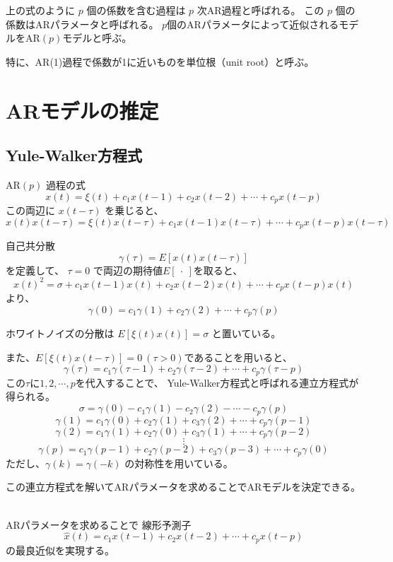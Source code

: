 \documentclass[uplatex,a4j,12pt,dvipdfmx]{jsarticle}
\begin{document}
上の式のように $p$ 個の係数を含む過程は $p$ 次AR過程と呼ばれる。
この $p$ 個の係数はARパラメータと呼ばれる。
$p$個のARパラメータによって近似されるモデルをAR$(p)$モデルと呼ぶ。

特に、AR(1)過程で係数が1に近いものを単位根（unit root）と呼ぶ。


\section{ARモデルの推定}

\subsection{Yule-Walker方程式}

AR$(p)$ 過程の式
\[
	x(t) = \xi(t) + c_{1} x(t-1) + c_{2} x(t-2) + \cdots + c_{p} x(t-p)
\]
この両辺に $x(t- \tau )$ を乗じると、
\[
	x(t)x(t- \tau ) = \xi(t)x(t- \tau ) + c_{1} x(t-1) x(t- \tau ) + \cdots + c_{p} x(t-p) x(t- \tau )
\]

自己共分散
\[
	\gamma(\tau) = E[ x(t) x(t-\tau) ]
\]
を定義して、
$\tau=0$ で両辺の期待値$E[ \ \cdot \ ]$を取ると、
\[
	x(t)^{2} = \sigma + c_{1} x(t-1) x(t) + c_{2} x(t-2) x(t) + \cdots + c_{p} x(t-p) x(t)
\]
より、
\[
	\gamma(0) = c_{1} \gamma(1) + c_{2} \gamma(2) + \cdots + c_{p} \gamma(p)
\]

ホワイトノイズの分散は $E[\xi(t)x(t)]=\sigma$ と置いている。

また、$E[\xi(t)x(t-\tau)]=0 \ (\tau>0)$であることを用いると、
\[
	\gamma(\tau) = c_{1} \gamma(\tau-1) + c_{2} \gamma(\tau-2) + \cdots + c_{p} \gamma(\tau-p)
\]
この$\tau$に$1,2,\cdots,p$を代入することで、
Yule-Walker方程式と呼ばれる連立方程式が得られる。
\[
	\sigma = \gamma(0) - c_{1} \gamma(1) - c_{2} \gamma(2) - \cdots - c_{p} \gamma(p)
\]
\[
	\gamma(1) = c_{1} \gamma(0) + c_{2} \gamma(1) + c_{3} \gamma(2) + \cdots + c_{p} \gamma(p-1)
\]
\[
	\gamma(2) = c_{1} \gamma(1) + c_{2} \gamma(0) + c_{3} \gamma(1) + \cdots + c_{p} \gamma(p-2)
\]
\[
	\vdots
\]
\[
	\gamma(p) = c_{1} \gamma(p-1) + c_{2} \gamma(p-2) + c_{3} \gamma(p-3) + \cdots + c_{p} \gamma(0)
\]
ただし、$\gamma(k)=\gamma(-k)$ の対称性を用いている。

この連立方程式を解いてARパラメータを求めることでARモデルを決定できる。

\ \\

ARパラメータを求めることで
線形予測子
\[
	\hat{x}(t) = c_{1} x(t-1) + c_{2} x(t-2) + \cdots + c_{p} x(t-p)
\]
の最良近似を実現する。
\end{document}
